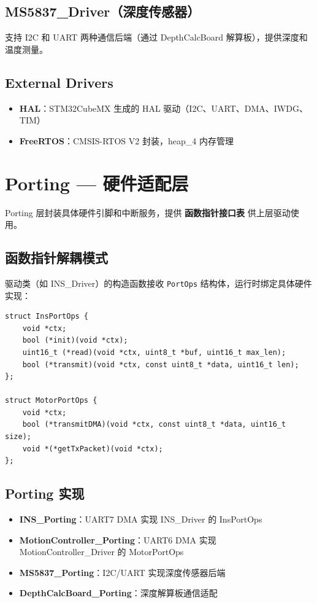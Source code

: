 \documentclass[12pt,a4paper]{article}
\begin{document}
\subsection{MS5837\_Driver（深度传感器）}

支持 I2C 和 UART 两种通信后端（通过 DepthCalcBoard 解算板），提供深度和温度测量。

\subsection{External Drivers}
\begin{itemize}
    \item \textbf{HAL}：STM32CubeMX 生成的 HAL 驱动（I2C、UART、DMA、IWDG、TIM）
    \item \textbf{FreeRTOS}：CMSIS-RTOS V2 封装，heap\_4 内存管理
\end{itemize}

\section{Porting — 硬件适配层}

Porting 层封装具体硬件引脚和中断服务，提供 \textbf{函数指针接口表} 供上层驱动使用。

\subsection{函数指针解耦模式}

驱动类（如 INS\_Driver）的构造函数接收 \texttt{PortOps} 结构体，运行时绑定具体硬件实现：

\begin{lstlisting}[caption={PortOps 接口模式示例}]
struct InsPortOps {
    void *ctx;
    bool (*init)(void *ctx);
    uint16_t (*read)(void *ctx, uint8_t *buf, uint16_t max_len);
    bool (*transmit)(void *ctx, const uint8_t *data, uint16_t len);
};

struct MotorPortOps {
    void *ctx;
    bool (*transmitDMA)(void *ctx, const uint8_t *data, uint16_t size);
    void *(*getTxPacket)(void *ctx);
};
\end{lstlisting}

\subsection{Porting 实现}

\begin{itemize}
    \item \textbf{INS\_Porting}：UART7 DMA 实现 INS\_Driver 的 InsPortOps
    \item \textbf{MotionController\_Porting}：UART6 DMA 实现 MotionController\_Driver 的 MotorPortOps
    \item \textbf{MS5837\_Porting}：I2C/UART 实现深度传感器后端
    \item \textbf{DepthCalcBoard\_Porting}：深度解算板通信适配
\end{itemize}
\end{document}
